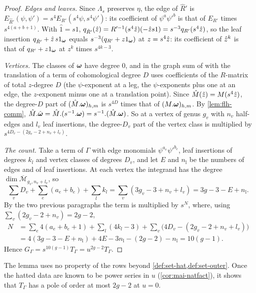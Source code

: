 \begin{proof}
\emph{Edges and leaves.} Since $\Lambda_s$ preserves $\eta$, the edge of $\hat R'$ is $E_{\hat R'}(\psi,\psi')=s^4E_{R'}(s^4\psi,s^4\psi')$: its coefficient of $\psi^a\psi'^b$ is that of $E_{R'}$ times $s^{4(a+b+1)}$. With $\hat1=s1$, $q_{\hat R'}(\hat{z})=R'^{-1}(s^4\hat{z})(-\hat{z} s1)=s^{-3}q_{R'}(s^4\hat{z})$, so the leaf insertion $q_{\hat R'}+\hat{z}\,s1_{\boldsymbol{\omega}}$ equals $s^{-3}(q_{R'}+z1_{\boldsymbol{\omega}})$ at $z=s^4\hat{z}$: its coefficient of $\hat{z}^k$ is that of $q_{R'}+z1_{\boldsymbol{\omega}}$ at $z^k$ times $s^{4k-3}$.

\emph{Vertices.} The classes of $\boldsymbol{\omega}$ have degree $0$, and in the graph sum of \cite[Def.~2.2]{PPZ15} with the translation of \cite[Def.~2.13]{PPZ15} a term of cohomological degree $D$ uses coefficients of the $R$-matrix of total $z$-degree $D$ (the $\psi$-exponent at a leg, the $\psi$-exponents plus one at an edge, the $z$-exponent minus one at a translation point). Since $\hat M(\hat{z})=M(s^4\hat{z})$, the degree-$D$ part of $(\hat M.\boldsymbol{\omega})_{h,m}$ is $s^{4D}$ times that of $(M.\boldsymbol{\omega})_{h,m}$. By \cref{lem:flh-comm}, $\hat M.\hat{\boldsymbol{\omega}}=\hat M.(s^{-1}.\boldsymbol{\omega})=s^{-1}.(\hat M.\boldsymbol{\omega})$. So at a vertex of genus $g_v$ with $n_v$ half-edges and $l_v$ leaf insertions, the degree-$D_v$ part of the vertex class is multiplied by $s^{4D_v-(2g_v-2+n_v+l_v)}$.

\emph{The count.} Take a term of $\Gamma$ with edge monomials $\psi^{a_e}\psi'^{b_e}$, leaf insertions of degrees $k_l$ and vertex classes of degrees $D_v$, and let $E$ and $n_{\mathrm l}$ be the numbers of edges and of leaf insertions. At each vertex the integrand has the degree $\dim\overline{\mathcal M}_{g_v,n_v+l_v}$, so
\[
\sum_vD_v+\sum_e(a_e+b_e)+\sum_lk_l=\sum_v(3g_v-3+n_v+l_v)=3g-3-E+n_{\mathrm l} .
\]
By the two previous paragraphs the term is multiplied by $s^N$, where, using $\sum_v(2g_v-2+n_v)=2g-2$,
\begin{align*}
N&=\sum_e4(a_e+b_e+1)+\sum_l(4k_l-3)+\sum_v\bigl(4D_v-(2g_v-2+n_v+l_v)\bigr)\\
&=4(3g-3-E+n_{\mathrm l})+4E-3n_{\mathrm l}-(2g-2)-n_{\mathrm l}=10(g-1).
\end{align*}
Hence $G_\Gamma=s^{10(g-1)}T_\Gamma=u^{2g-2}T_\Gamma$.
\end{proof}

The lemma uses no property of the rows beyond \cref{def:set-hat,def:set-outer}. Once the hatted data are known to be power series in $u$ (\cref{cor:mai-natfact}), it shows that $T_\Gamma$ has a pole of order at most $2g-2$ at $u=0$.

